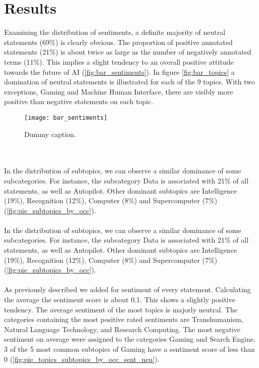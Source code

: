 \section{Results}
\label{results}
Examining the distribution of sentiments, a definite majority of neutral statements (69\%) is clearly obvious.
The proportion of positive annotated statements (21\%) is about twice as large as the number of negatively annotated terms (11\%).
This implies a slight tendency to an overall positive attitude towards the future of AI (\autoref{fig:bar_sentiments}).
In figure \ref{fig:bar_topics} a domination of neutral statements is illustrated for each of the 9 topics.
With two exceptions, Gaming and Machine Human Interface, there are visibly more positive than negative statements on each topic.
\begin{figure}[t]
    \centering
    \texttt{[image: bar\_sentiments]}
    \caption{
        Dummy caption.
    }
    \label{fig:bar_sentiments}
\end{figure}
\\
\\
In the distribution of subtopics, we can observe a similar dominance of some subcategories.
For instance, the subcategory Data is associated with 21\% of all statements, as well as Autopilot.
Other dominant subtopics are Intelligence (19\%), Recognition (12\%), Computer (8\%) and Supercomputer (7\%) (\autoref{fig:pie_subtopics_by_occ}).
\\
\\
In the distribution of subtopics, we can observe a similar dominance of some subcategories.
For instance, the subcategory Data is associated with 21\% of all statements, as well as Autopilot.
Other dominant subtopics are Intelligence (19\%), Recognition (12\%), Computer (8\%) and Supercomputer (7\%) (\autoref{fig:pie_subtopics_by_occ}).
\\
\\
As previously described we added for sentiment of every statement.
Calculating the average the sentiment score is about 0.1.
This shows a slightly positive tendency.
The average sentiment of the most topics is majorly neutral.
The categories containing the most positive rated sentiments are Transhumanism, Natural Language Technology, and Research Computing.
The most negative sentiment on average were assigned to the categories Gaming and Search Engine.
3 of the 5 most common subtopics of Gaming have a sentiment score of less than 0 (\autoref{fig:pie_topics_subtopics_by_occ_sent_neu}).
